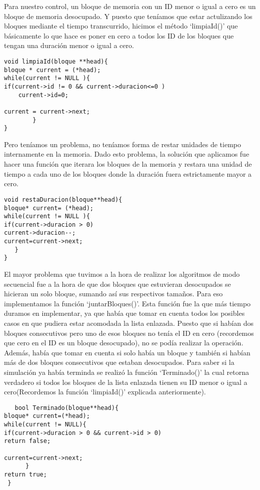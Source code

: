 \documentclass[10pt,a4paper]{article}
\begin{document}
Para nuestro control, un bloque de memoria con un ID menor o igual a cero es un bloque de memoria desocupado. Y puesto que teníamos que estar actulizando los bloques mediante el tiempo transcurrido, hicimos el método `limpiaId()' que básicamente lo que hace es poner en cero a todos los ID de los bloques que tengan una duración menor o igual a cero.
\begin{verbatim}
void limpiaId(bloque **head){
bloque * current = (*head);
while(current != NULL ){
if(current->id != 0 && current->duracion<=0 )
	current->id=0;

current = current->next;
	    }
}
\end{verbatim}
Pero teníamos un problema, no teníamos forma de restar unidades de tiempo internamente en la memoria. Dado esto problema, la solución que aplicamos fue hacer una función que iterara los bloques de la memoria y restara una unidad de tiempo a cada uno de los bloques donde la duración fuera estrictamente mayor a cero.
\begin{verbatim}
void restaDuracion(bloque**head){
bloque* current= (*head);
while(current != NULL ){
if(current->duracion > 0)
current->duracion--;
current=current->next;
   }
}
\end{verbatim}
El mayor problema que tuvimos a la hora de realizar los algoritmos de modo secuencial fue a la hora de que dos bloques que estuvieran desocupados se hicieran un solo bloque, sumando así sus respectivos tamaños. Para eso implementamos la función `juntarBloques()'. 
Esta función fue la que más tiempo duramos en implementar, ya que había que tomar en cuenta todos los posibles casos en que pudiera estar acomodada la lista enlazada. Puesto que si habían dos bloques consecutivos pero uno de esos bloques no tenía el ID en cero (recordemos que cero en el ID es un bloque desocupado), no se podía realizar la operación.
Además, había que tomar en cuenta si solo había un bloque y también si habían más de dos bloques consecutivos que estaban desocupados.
Para saber si la simulación ya había terminda se realizó la función `Terminado()' la cual retorna verdadero si todos los bloques de la lista enlazada tienen su ID menor o igual a cero(Recordemos la función `limpiaId()' explicada anteriormente).
\begin{verbatim}
   bool Terminado(bloque**head){
bloque* current=(*head);
while(current != NULL){
if(current->duracion > 0 && current->id > 0)
return false;

current=current->next;
      }
return true;
 }
\end{verbatim}
  
\end{document}
